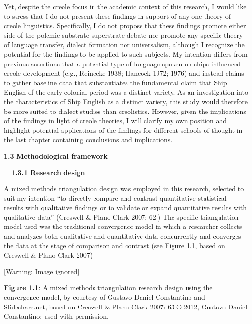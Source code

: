\begin{styleNormali}
Yet, despite the creole focus in the academic context of this research, I would like to stress that I do not present these findings in support of any one theory of creole linguistics. Specifically, I do not propose that these findings promote either side of the polemic substrate-superstrate debate nor promote any specific theory of language transfer, dialect formation nor universalism, although I recognize the potential for the findings to be applied to such subjects. My intention differs from previous assertions that a potential type of language spoken on ships influenced creole development (e.g., Reinecke 1938; Hancock 1972; 1976) and instead claims to gather baseline data that substantiates the fundamental claim that Ship English of the early colonial period was a distinct variety. As an investigation into the characteristics of Ship English as a distinct variety, this study would therefore be more suited to dialect studies than creolistics. However, given the implications of the findings in light of creole theories, I will clarify my own position and highlight potential applications of the findings for different schools of thought in the last chapter containing conclusions and implications. 
\end{styleNormali}


\begin{styleNormali}
\textbf{1.3 Methodological framework}
\end{styleNormali}


\begin{styleNormali}
\textbf{\ \ 1.3.1 Research design}
\end{styleNormali}


\begin{styleNormali}
A mixed methods triangulation design was employed in this research, selected to suit my intention “to directly compare and contrast quantitative statistical results with qualitative findings or to validate or expand quantitative results with qualitative data” (Creswell \& Plano Clark 2007: 62.) The specific triangulation model used was the traditional convergence model in which a researcher collects and analyzes both qualitative and quantitative data concurrently and converges the data at the stage of comparison and contrast (see Figure 1.1, based on Creswell \& Plano Clark 2007)
\end{styleNormali}


\begin{center}
 [Warning: Image ignored] %

\end{center}
\begin{styleNormali}
\textbf{Figure 1.1}: A mixed methods triangulation research design using the convergence model, by courtesy of Gustavo Daniel Constantino and Slideshare.net, based on Creswell \& Plano Clark 2007: 63 © 2012, Gustavo Daniel Constantino; used with permission. 
\end{styleNormali}


